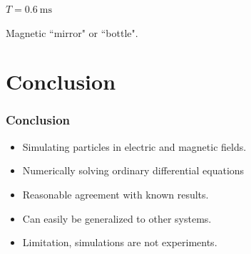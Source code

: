 \documentclass{beamer}
\begin{document}
\begin{frame}
\begin{centering}
{$T = \SI{0.6}{\milli\second}$

Magnetic ``mirror" or ``bottle".
}%
%
%
\end{centering}
\end{frame}


\section{Conclusion}

\begin{frame}
\frametitle{Conclusion }
\begin{itemize}
\item<1-> Simulating particles in electric and magnetic fields.
\item<2-> Numerically solving ordinary differential equations
\item<2-> Reasonable agreement with known results.
\item<2-> Can easily be generalized to other systems.
\item<3-> Limitation, simulations are not experiments.
\end{itemize}
\end{frame}
\end{document}
